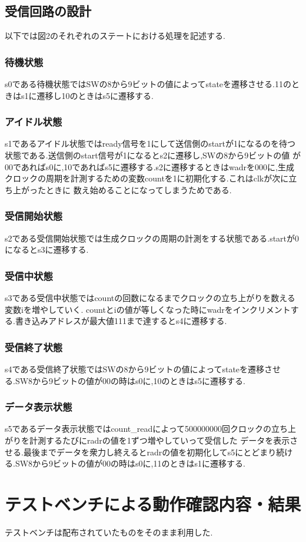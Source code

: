 \documentclass[dvipdfmx]{jarticle}
\begin{document}
\subsection{受信回路の設計}
以下では図2のそれぞれのステートにおける処理を記述する.
\subsubsection{待機状態}
s0である待機状態ではSWの8から9ビットの値によってstateを遷移させる.11のときはs1に遷移し10のときはs5に遷移する.
\subsubsection{アイドル状態}
s1であるアイドル状態ではready信号を1にして送信側のstartが1になるのを待つ状態である.送信側のstart信号が1になるとs2に遷移し,SWの8から9ビットの値
が00であればs0に,10であればs5に遷移する.s2に遷移するときはwadrを000に,生成クロックの周期を計測するための変数countを1に初期化する.これはclkが次に立ち上がったときに
数え始めることになってしまうためである.
\subsubsection{受信開始状態}
s2である受信開始状態では生成クロックの周期の計測をする状態である.startが0になるとs3に遷移する.
\subsubsection{受信中状態}
s3である受信中状態ではcountの回数になるまでクロックの立ち上がりを数える変数iを増やしていく.
countとiの値が等しくなった時にwadrをインクリメントする.書き込みアドレスが最大値111まで達するとs4に遷移する.
\subsubsection{受信終了状態}
s4である受信終了状態ではSWの8から9ビットの値によってstateを遷移させる.SW8から9ビットの値が00の時はs0に,10のときはs5に遷移する.
\subsubsection{データ表示状態}
s5であるデータ表示状態ではcount\_readによって500000000回クロックの立ち上がりを計測するたびにradrの値を1ずつ増やしていって受信した
データを表示させる.最後までデータを衆力し終えるとradrの値を初期化してs5にとどまり続ける.SW8から9ビットの値が00の時はs0に,11のときはs1に遷移する.
\section{テストベンチによる動作確認内容・結果}
テストベンチは配布されていたものをそのまま利用した.
\end{document}
